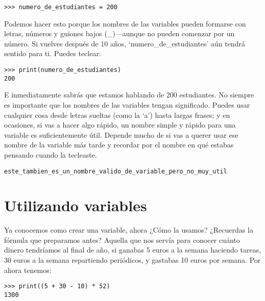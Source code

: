 \begin{listing}
\begin{verbatim}
>>> numero_de_estudiantes = 200
\end{verbatim}
\end{listing}

Podemos hacer esto porque los nombres de las variables pueden formarse con letras, números y guiones bajos (\_)---aunque no pueden comenzar por un número.  Si vuelves después de 10 años, `numero\_de\_estudiantes' aún tendrá sentido para ti. Puedes teclear:

\begin{listing}
\begin{verbatim}
>>> print(numero_de_estudiantes)
200
\end{verbatim}
\end{listing}

\noindent
E inmediatamente sabrás que estamos hablando de 200 estudiantes.  No siempre es importante que los nombres de las variables tengan significado. Puedes usar cualquier cosa desde letras sueltas (como la `a') hasta largas frases; y en ocasiones, si vas a hacer algo rápido, un nombre simple y rápido para una variable es suficientemente útil.  Depende mucho de si vas a querer usar ese nombre de la variable más tarde y recordar por el nombre en qué estabas pensando cuando la tecleaste.

\begin{listing}
\begin{verbatim}
este_tambien_es_un_nombre_valido_de_variable_pero_no_muy_util
\end{verbatim}
\end{listing}

\section{Utilizando variables}

Ya conocemos como crear una variable, ahora ¿Cómo la usamos?  ¿Recuerdas la fórmula que preparamos antes?  Aquella que nos servía para conocer cuánto dinero tendríamos al final de año, si ganabas 5 euros a la semana haciendo tareas, 30 euros a la semana repartiendo periódicos, y gastabas 10 euros por semana.  Por ahora tenemos: 

\begin{listing}
\begin{verbatim}
>>> print((5 + 30 - 10) * 52)
1300
\end{verbatim}
\end{listing}


